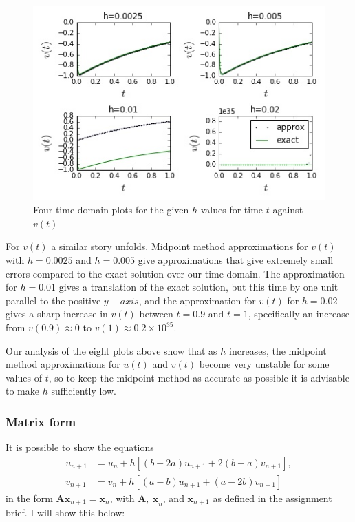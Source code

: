 \documentclass[11pt,a4paper]{article}
\begin{document}
\begin{figure}[h]
\caption{Four time-domain plots for the given $h$ values for time $t$ against $v(t)$}
\includegraphics[scale=0.8]{t_vt_sub.jpg}
\centering
\end{figure}

For $v(t)$ a similar story unfolds. Midpoint method approximations for $v(t)$ with $h=0.0025$ and $h=0.005$ give approximations that give extremely small errors compared to the exact solution over our time-domain. The approximation for $h=0.01$ gives a translation of the exact solution, but this time by one unit parallel to the positive $y-axis$, and the approximation for $v(t)$ for $h=0.02$ gives a sharp increase in $v(t)$ between $t=0.9$ and $t=1$, specifically an increase from $v(0.9)\approx 0$ to $v(1)\approx 0.2\times 10^{35}.$

Our analysis of the eight plots above show that as $h$ increases, the midpoint method approximations for $u(t)$ and $v(t)$ become very unstable for some values of $t$, so to keep the midpoint method as accurate as possible it is advisable to make $h$ sufficiently low.

\subsubsection*{Matrix form}
It is possible to show the equations
\begin{align*}
u_{n+1}&=u_n+h[(b-2a)u_{n+1}+2(b-a)v_{n+1}],\\
v_{n+1}&=v_{n}+h[(a-b)u_{n+1} +(a-2b)v_{n+1}]
\end{align*}
in the form $\boldsymbol{Ax}_{n+1}=\boldsymbol{x}_n$, with $\boldsymbol{A,\ x}_n$, and $\boldsymbol{x}_{n+1}$ as defined in the assignment brief. I will show this below: 
\end{document}
